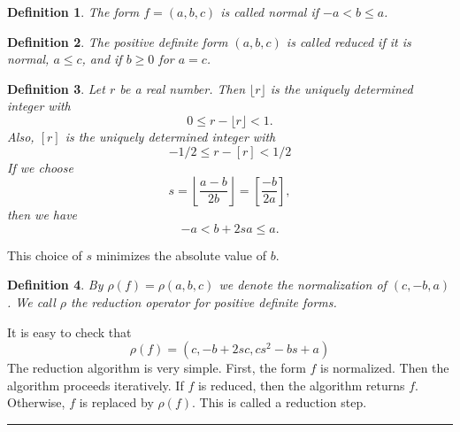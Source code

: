 \documentclass[12pt, letterpaper]{report}
\newtheorem{definition}{Definition}
\newtheorem{algorithm}{Algorithm}
\begin{document}
\begin{definition}
The form $f=(a,b,c)$ is called normal if  $−a < b \le a$.
\end{definition}

\begin{definition}
The positive definite form $(a, b, c)$ is called reduced if it is normal, $a \le c$, and if $b \ge 0$ for $a = c$.
\end{definition}

\begin{definition}
Let $r$ be a real number. Then  $\lfloor r \rfloor$ is the uniquely determined
integer with
$$
0 \le r- \lfloor r \rfloor < 1 .
$$
Also, $[r]$ is the uniquely determined integer with
$$
−1/2 \le r - [r] < 1/2
$$
If we choose
$$
s = \left\lfloor\frac{a-b}{2b}\right\rfloor = \left[\frac{-b}{2a}\right],
$$
then we have
$$
−a < b + 2sa \le a .
$$
\end{definition}
\noindent
This choice of $s$ minimizes the absolute value of $b$.
\begin{definition}
By $\rho(f) = \rho(a, b, c)$ we denote the normalization of
$(c, -b, a)$. We call $\rho$ the reduction operator for positive definite forms.
\end{definition}
It is easy to check that
$$
\rho(f) = (c, -b + 2sc, cs^2 - bs + a)
$$
The reduction algorithm is very simple. 
First, the form $f$ is normalized. Then the algorithm proceeds iteratively. If $f$ is reduced, then the algorithm
returns $f$. Otherwise, $f$ is replaced by $\rho(f)$. This is called a reduction step.
\noindent\rule{\textwidth}{0.4pt}
\end{document}
